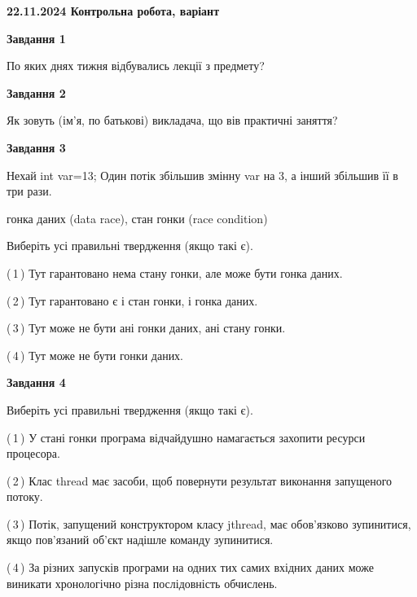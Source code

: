 \documentclass[12pt, ukrainian]{article}
\begin{document}
\begin {large}

\textbf{22.11.2024 Контрольна робота, варіант  }\par


{

\begin{center}
\textbf{Завдання 1}
\end{center}

По яких днях тижня відбувались лекції з предмету?


\begin{center}
\textbf{Завдання 2}
\end{center}

Як зовуть (ім'я, по батькові) викладача, що вів практичні заняття?


\begin{center}
\textbf{Завдання 3}
\end{center}

Нехай int var=13; Один потік збільшив змінну var на 3, а інший збільшив її в три рази.

гонка даних (data race), стан гонки (race condition)

Виберіть усі правильні твердження (якщо такі є).\par
\vspace{2mm}
(\,1\,) Тут гарантовано нема стану гонки, але може бути гонка даних.%

(\,2\,) Тут гарантовано є і стан гонки, і гонка даних.%

(\,3\,) Тут може не бути ані гонки даних, ані стану гонки.%

(\,4\,) Тут може не бути гонки даних.%


\begin{center}
\textbf{Завдання 4}
\end{center}

Виберіть усі правильні твердження (якщо такі є).\par
\vspace{2mm}

(\,1\,) У стані гонки програма відчайдушно намагається захопити ресурси процесора.%

(\,2\,) Клас thread має засоби, щоб повернути результат виконання запущеного потоку.%

(\,3\,) Потік, запущений конструктором класу jthread, має обов’язково зупинитися, якщо пов’язаний об’єкт надішле команду зупинитися.%

(\,4\,) За різних запусків програми на одних тих самих вхідних даних може виникати хронологічно різна послідовність обчислень.%


}
\end{large}
\end{document}
